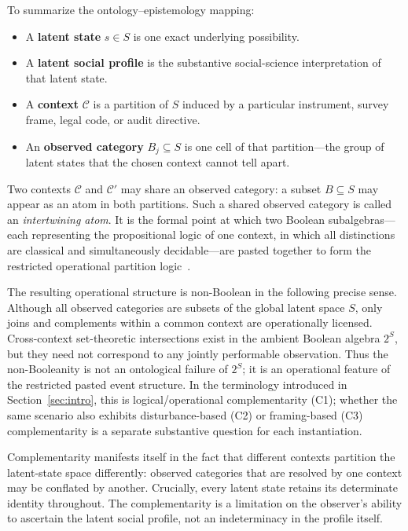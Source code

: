 \documentclass{article}
\begin{document}
To summarize the ontology--epistemology mapping:
\begin{itemize}
\item A \textbf{latent state} $s \in S$ is one exact underlying
  possibility.
\item A \textbf{latent social profile} is the substantive
  social-science interpretation of that latent state.
\item A \textbf{context} $\mathcal{C}$ is a partition of $S$
  induced by a particular instrument, survey frame, legal code,
  or audit directive.
\item An \textbf{observed category} $B_j \subseteq S$ is one cell
  of that partition---the group of latent states that the chosen
  context cannot tell apart.
\end{itemize}

Two contexts $\mathcal{C}$ and $\mathcal{C}'$ may share an observed
category: a subset $B \subseteq S$ may appear as an atom in both
partitions. Such a shared observed category is called an
\emph{intertwining atom}. It is the formal point at which two
Boolean subalgebras---each representing the propositional logic of
one context, in which all distinctions are classical and
simultaneously decidable---are pasted together to form the restricted
operational partition logic~\cite{greechie-1974,wright:pent,
svozil-2018-b}.

The resulting operational structure is non-Boolean in the following
precise sense. Although all observed categories are subsets of the
global latent space $S$, only joins and complements within a common
context are operationally licensed. Cross-context set-theoretic
intersections exist in the ambient Boolean algebra $2^S$, but they
need not correspond to any jointly performable observation. Thus the
non-Booleanity is not an ontological failure of $2^S$; it is an
operational feature of the restricted pasted event structure. In
the terminology introduced in Section~\ref{sec:intro}, this is
logical/operational complementarity (C1); whether the same scenario
also exhibits disturbance-based (C2) or framing-based (C3)
complementarity is a separate substantive question for each
instantiation.

Complementarity manifests itself in the fact that different contexts
partition the latent-state space differently: observed categories
that are resolved by one context may be conflated by another.
Crucially, every latent state retains its determinate identity
throughout. The complementarity is a limitation on the observer's
ability to ascertain the latent social profile, not an indeterminacy
in the profile itself.
\end{document}
